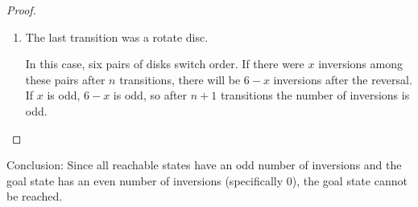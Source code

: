 \documentclass[12pt,oneside]{article}
\begin{document}
\begin{problem}{20}
{\begin{proof}
\begin{enumerate}
In this case, the left-to-right order of the discs does not change and thus the number of inversions remains the same as in 

\item The last transition was a rotate disc.

In this case, six pairs of disks switch order.  If there were $x$ inversions among these pairs after $n$ transitions, there will be $6 - x$ inversions after the reversal. If $x$ is odd, $6-x$ is odd, so after $n+1$ transitions the number of inversions is odd.
\end{enumerate}
\end{proof}

Conclusion: Since all reachable states have an odd number of inversions and the goal state has an even number of inversions (specifically 0), the goal state cannot be reached.
}


\end{problem}
\end{document}
